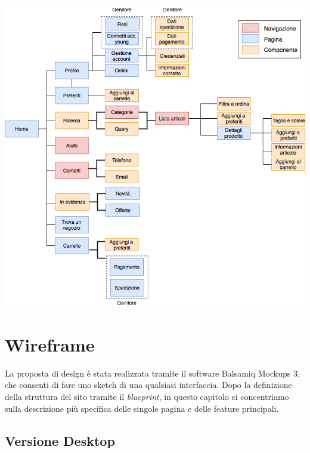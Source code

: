 \documentclass[12pt,a4paper]{report}
\begin{document}
\includegraphics[width=1\textwidth]{"Project Management Sources/Wireframe/Blueprint"}
\chapter{Wireframe}
La proposta di design è stata realizzata tramite il software Balsamiq Mockups 3, che consenti di fare uno sketch di una qualsiasi interfaccia. Dopo la definizione della struttura del sito tramite il \textit{blueprint}, in questo capitolo ci concentriamo sulla descrizione più specifica delle singole pagina e delle feature principali.
\section{Versione Desktop}
\end{document}
